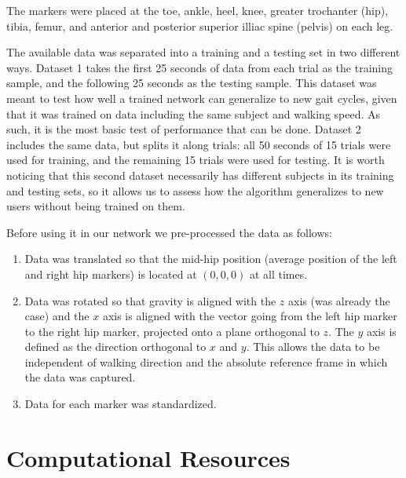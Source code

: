 \documentclass{acm_proc_article-sp}
\begin{document}
The markers were placed at the toe, ankle, heel, knee, greater trochanter (hip), tibia, femur, and anterior and posterior superior illiac spine (pelvis) on each leg.

The available data was separated into a training and a testing set in two different ways. Dataset 1 takes the first 25 seconds of data from each trial as the training sample, and the following 25 seconds as the testing sample. This dataset was meant to test how well a trained network can generalize to new gait cycles, given that it was trained on data including the same subject and walking speed. As such, it is the most basic test of performance that can be done. Dataset 2 includes the same data, but splits it along trials: all 50 seconds of 15 trials were used for training, and the remaining 15 trials were used for testing. It is worth noticing that this second dataset necessarily has different subjects in its training and testing sets, so it allows us to assess how the algorithm generalizes to new users without being trained on them.

Before using it in our network we pre-processed the data as follows:
\begin{enumerate}
 \item Data was translated so that the mid-hip position (average position of the left and right hip markers) is located at $(0,0,0)$ at all times.
 \item Data was rotated so that gravity is aligned with the $z$ axis (was already the case) and the $x$ axis is aligned with the vector going from the left hip marker to the right hip marker, projected onto a plane orthogonal to $z$. The $y$ axis is defined as the direction orthogonal to $x$ and $y$. This allows the data to be independent of walking direction and the absolute reference frame in which the data was captured.
 \item Data for each marker was standardized.
\end{enumerate}


\section{Computational Resources}
\label{sec:Computational Resources}
\end{document}
